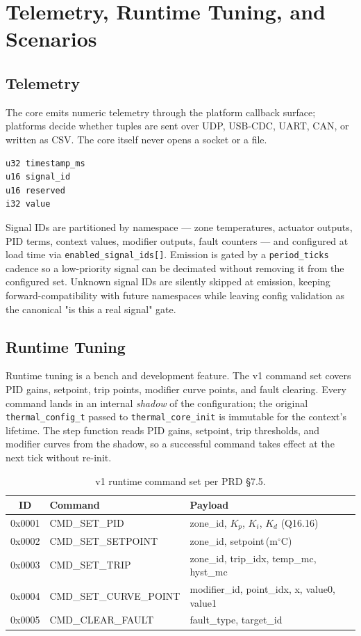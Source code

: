 \section{Telemetry, Runtime Tuning, and Scenarios}

\subsection{Telemetry}

The core emits numeric telemetry through the platform callback surface; platforms decide whether tuples are sent over UDP, USB-CDC, UART, CAN, or written as CSV. The core itself never opens a socket or a file.

\begin{lstlisting}[caption={Telemetry frame sketch}]
u32 timestamp_ms
u16 signal_id
u16 reserved
i32 value
\end{lstlisting}

Signal IDs are partitioned by namespace --- zone temperatures, actuator outputs, PID terms, context values, modifier outputs, fault counters --- and configured at load time via \texttt{enabled\_signal\_ids[]}. Emission is gated by a \texttt{period\_ticks} cadence so a low-priority signal can be decimated without removing it from the configured set. Unknown signal IDs are silently skipped at emission, keeping forward-compatibility with future namespaces while leaving config validation as the canonical "is this a real signal" gate.

\subsection{Runtime Tuning}

Runtime tuning is a bench and development feature. The v1 command set covers PID gains, setpoint, trip points, modifier curve points, and fault clearing. Every command lands in an internal \emph{shadow} of the configuration; the original \texttt{thermal\_config\_t} passed to \texttt{thermal\_core\_init} is immutable for the context's lifetime. The step function reads PID gains, setpoint, trip thresholds, and modifier curves from the shadow, so a successful command takes effect at the next tick without re-init.

\begin{table}[h]
\centering
\begin{tabular}{cll}
\toprule
\textbf{ID} & \textbf{Command} & \textbf{Payload} \\
\midrule
0x0001 & CMD\_SET\_PID          & zone\_id, $K_p$, $K_i$, $K_d$ (Q16.16) \\
0x0002 & CMD\_SET\_SETPOINT     & zone\_id, setpoint\,(m$^\circ$C) \\
0x0003 & CMD\_SET\_TRIP         & zone\_id, trip\_idx, temp\_mc, hyst\_mc \\
0x0004 & CMD\_SET\_CURVE\_POINT & modifier\_id, point\_idx, x, value0, value1 \\
0x0005 & CMD\_CLEAR\_FAULT      & fault\_type, target\_id \\
\bottomrule
\end{tabular}
\caption{v1 runtime command set per PRD §7.5.}
\label{tab:v1-commands}
\end{table}

